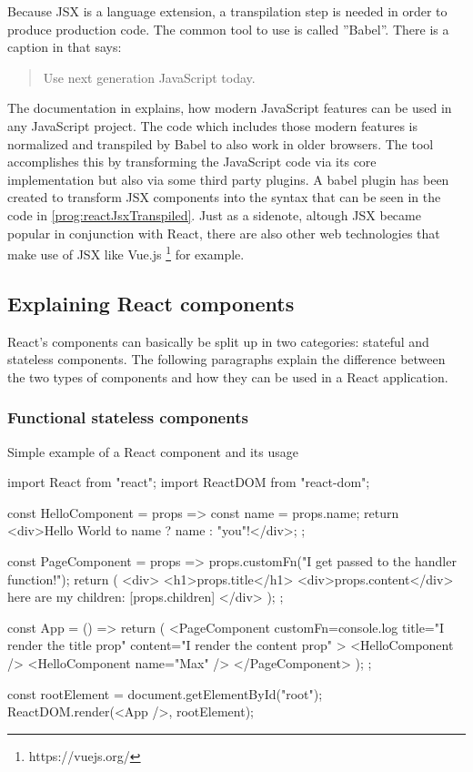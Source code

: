 Because JSX is a language extension, a transpilation step is needed in order to produce production code. The common tool to use is called ''Babel''. There is a caption in \cite{Babel} that says: \begin{quote}\begin{english}Use next generation JavaScript today.\end{english}\end{quote} The documentation in \cite[/docs/en]{Babel} explains, how modern JavaScript features can be used in any JavaScript project. The code which includes those modern features is normalized and transpiled by Babel to also work in older browsers. The tool accomplishes this by transforming the JavaScript code via its core implementation but also via some third party plugins. A babel plugin has been created to transform JSX components into the syntax that can be seen in the code in \ref{prog:reactJsxTranspiled}. Just as a sidenote, altough JSX became popular in conjunction with React, there are also other web technologies that make use of JSX like Vue.js \footnote{https://vuejs.org/} for example.

\subsection{Explaining React components}
\label{sec:reactComponents}

React's components can basically be split up in two categories: stateful and stateless components. The following paragraphs explain the difference between the two types of components and how they can be used in a React application.

\subsubsection{Functional stateless components}

\begin{program}
\caption{Simple example of a React component and its usage} 
\label{prog:reactHelloWorld}
\begin{JsCode}
import React from "react";
import ReactDOM from "react-dom";

const HelloComponent = props => {
  const name = props.name;
  return <div>Hello World to {name ? name : "you"}!</div>;
};

const PageComponent = props => {
  props.customFn("I get passed to the handler function!");
  return (
    <div>
      <h1>{props.title}</h1>
      <div>{props.content}</div>
      here are my children: [{props.children}]
    </div>
  );
};

const App = () => {
  return (
    <PageComponent
      customFn={console.log}
      title="I render the title prop"
      content="I render the content prop"
    >
      <HelloComponent />
      <HelloComponent name={"Max"} />
    </PageComponent>
  );
};

const rootElement = document.getElementById("root");
ReactDOM.render(<App />, rootElement);  
\end{JsCode}
\end{program}

